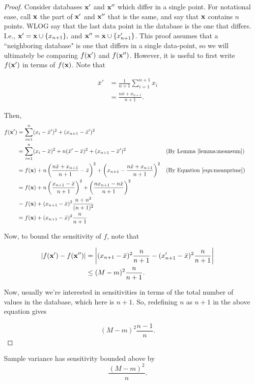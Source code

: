 \documentclass[11pt, oneside]{article}   	%
\begin{document}
\begin{proof}
Consider databases $\textbf{x}'$ and $\textbf{x}''$ which differ in a single point. For notational ease, call $\textbf{x}$ the part of $\textbf{x}'$ and $\textbf{x}''$
that is the same, and say that $\textbf{x}$ contains $n$ points. WLOG say that the last data point in the database is the one that differs. I.e.,  
$\textbf{x}' = \textbf{x} \cup \{x_{n+1}\},$ and $\textbf{x}'' = \textbf{x} \cup \{x'_{n+1}\}$. This proof assumes that a ``neighboring database" is one that differs in a single
data-point, so we will ultimately be comparing $f(\textbf{x}')$ and $f(\textbf{x}'')$. However, it is useful to first write $f(\textbf{x}')$ in terms of $f(\textbf{x})$.
Note that

\begin{align}
\label{eqn:meanprime}
\bar{x}' &= \frac{1}{n+1} \sum_{i=1}^{n+1} x_i \nonumber \\
	&= \frac{n\bar{x} + x_{n+1}}{n+1}.
\end{align}

Then,
\begin{align*}
f(\textbf{x}') &= \sum_{i=1}^n (x_i - \bar{x}')^2 + (x_{n+1} - \bar{x}')^2\\
	&= \sum_{i=1}^n (x_i - \bar{x})^2 + n(\bar{x}'-\bar{x})^2 + (x_{n+1} - \bar{x}')^2 &&\text{(By Lemma \ref{lemma:meansum})}\\
	&= f(\textbf{x}) + n\left( \frac{n\bar{x} + x_{n+1}}{n+1}-\bar{x}\right)^2 + \left(x_{n+1} - \frac{n\bar{x} + x_{n+1}}{n+1} \right)^2 &&\text{(By Equation \ref{eqn:meanprime})}\\
	&= f(\textbf{x}) + n\left(\frac{x_{n+1}-\bar{x}}{n+1}\right)^2 + \left( \frac{nx_{n+1}-n\bar{x}}{n+1}\right)^2\\
	&= f(\textbf{x}) + (x_{n+1}-\bar{x})^2 \frac{n+n^2}{(n+1)^2}\\
	&= f(\textbf{x}) + (x_{n+1}-\bar{x})^2 \frac{n}{n+1}\\
\end{align*}

Now, to bound the sensitivity of $f$, note that

\begin{align*}
\left\vert f(\textbf{x}') - f(\textbf{x}'') \right\vert &= \left\vert (x_{n+1}-\bar{x})^2 \frac{n}{n+1} - (x_{n+1}'-\bar{x})^2 \frac{n}{n+1} \right\vert\\
	&\le (M-m)^2 \frac{n}{n+1}.
\end{align*}

Now, usually we're interested in sensitivities in terms of the total number of values in the database, which here is $n+1$. So, redefining $n$ as $n+1$ in the above equation gives

$$ (M-m)^2 \frac{n-1}{n}.$$
\end{proof}

\begin{corollary}
Sample variance has sensitivity bounded above by 
$$ \frac{(M-m)^2 }{n}.$$
\end{corollary}
\end{document}
